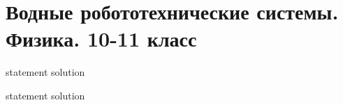 \chapter{Водные робототехнические системы. Физика. 10-11 класс}

{statement}
{solution}

{statement}
{solution}